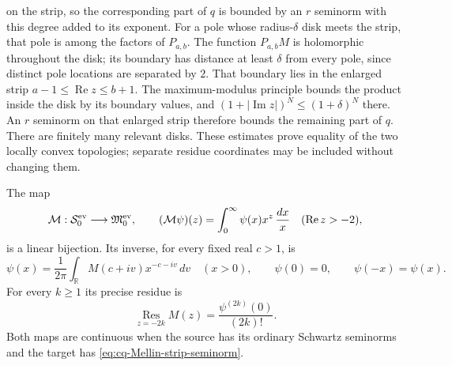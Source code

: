 on the strip, so the corresponding part of $q$ is bounded by
an $r$ seminorm with this degree added to its exponent.
For a pole whose radius-$\delta$ disk meets the strip, that pole
is among the factors of $P_{a,b}$. The function $P_{a,b}M$
is holomorphic throughout the disk; its boundary has distance
at least $\delta$ from every pole, since distinct pole locations
are separated by $2$. That boundary lies in the enlarged strip
$a-1\leq\operatorname{Re}z\leq b+1$. The maximum-modulus
principle bounds the product inside the disk by its boundary
values, and $(1+|\operatorname{Im}z|)^N\leq(1+\delta)^N$
there. An $r$ seminorm on that enlarged strip therefore bounds
the remaining part of $q$. There are finitely many relevant disks.
These estimates prove equality of the two locally convex
topologies; separate residue coordinates may be included without
changing them.

The map
\begin{equation}\label{eq:cq-Mellin-isomorphism}
 \mathcal M:\mathcal S_0^{\rm ev}\longrightarrow
                 \mathfrak M_0^{\rm ev},\qquad
 (\mathcal M\psi)(z)=\int_0^\infty\psi(x)x^z\,\frac{dx}{x}
 \quad(\operatorname{Re}z>-2),
\end{equation}
is a linear bijection. Its inverse, for every fixed real $c>1$, is
\begin{equation}\label{eq:cq-Mellin-reconstruction}
 \psi(x)=\frac1{2\pi}\int_{\mathbb R}
              M(c+iv)x^{-c-iv}\,dv\quad(x>0),
 \qquad \psi(0)=0,\qquad\psi(-x)=\psi(x).
\end{equation}
For every $k\geq1$ its precise residue is
\begin{equation}\label{eq:cq-Mellin-Taylor-residue}
 \operatorname*{Res}_{z=-2k}M(z)
       =\frac{\psi^{(2k)}(0)}{(2k)!}.
\end{equation}
Both maps are continuous when the source has its ordinary Schwartz
seminorms and the target has \eqref{eq:cq-Mellin-strip-seminorm}.

